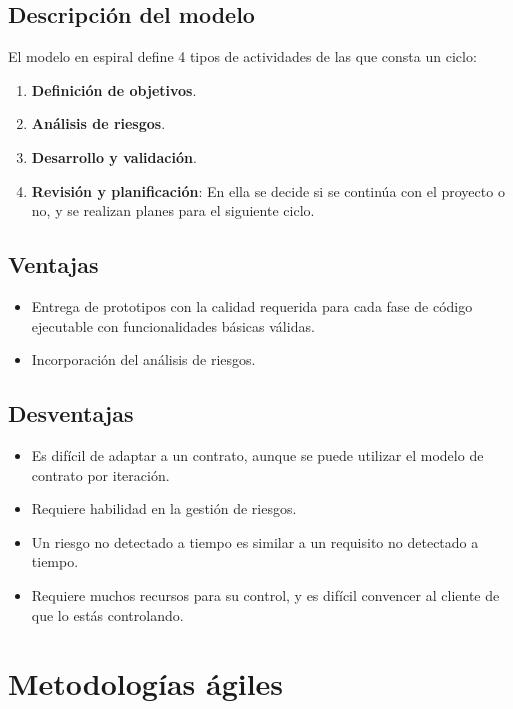 \subsection{Descripción del modelo}
El modelo en espiral define 4 tipos de actividades de las que consta un ciclo:
\begin{enumerate}
   \item \textbf{Definición de objetivos}.
   \item \textbf{Análisis de riesgos}.
   \item \textbf{Desarrollo y validación}.
   \item \textbf{Revisión y planificación}: En ella se decide si se continúa con el proyecto o no, y se realizan planes para el siguiente ciclo.
\end{enumerate}



\subsection{Ventajas}%
\begin{itemize}
   \item Entrega de prototipos con la calidad requerida para cada fase de código ejecutable con funcionalidades básicas válidas.
   \item Incorporación del análisis de riesgos.
\end{itemize}

\subsection{Desventajas}
\begin{itemize}
   \item Es difícil de adaptar a un contrato, aunque se puede utilizar el modelo de contrato por iteración.
   \item Requiere habilidad en la gestión de riesgos.
   \item Un riesgo no detectado a tiempo es similar a un requisito no detectado a tiempo. %
   \item Requiere muchos recursos para su control, y es difícil convencer al cliente de que lo estás controlando.
\end{itemize}

\section{Metodologías ágiles}

